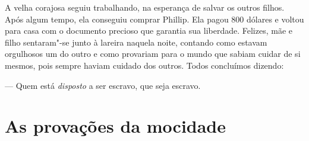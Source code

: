 A velha corajosa seguiu trabalhando, na
esperança de salvar os outros filhos. Após algum tempo, ela conseguiu
comprar Phillip. Ela pagou 800 dólares e voltou para casa com o
documento precioso que garantia sua liberdade. Felizes, mãe e filho
sentaram"-se junto à lareira naquela noite, contando como estavam
orgulhosos um do outro e como provariam para o mundo que sabiam cuidar
de si mesmos, pois sempre haviam cuidado dos outros. Todos concluímos
dizendo:

--- Quem está \emph{disposto} a ser escravo, que seja escravo.

\chapter*{As provações da mocidade}

